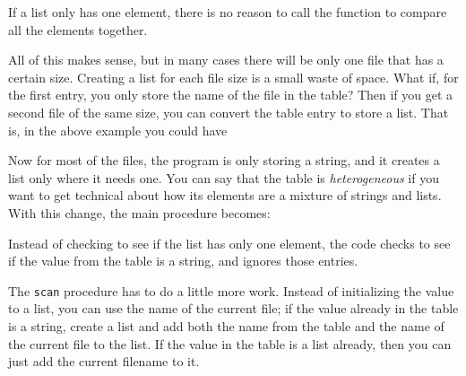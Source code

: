 
If a list only has one element, there is no reason to call the function
to compare all the elements together. 

All of this makes sense, but in many cases there will be only one file
that has a certain size. Creating a list for each file size is a small
waste of space. What if, for the first entry, you only store the name
of the file in the table? Then if you get a second file of the same
size, you can convert the table entry to store a list. That is, in the
above example you could have 


Now for most of the files, the program is only storing a string, and it
creates a list only where it needs one. You can say that the table is
\textit{heterogeneous} if you want to get technical about how its
elements are a mixture of strings and lists. With this change, the main
procedure becomes:


Instead of checking to see if the list has only one element, the code
checks to see if the value from the table is a string, and ignores
those entries.

The \texttt{scan} procedure has to do a little more work. Instead of initializing
the value to a list, you can use the name of the current file; if the
value already in the table is a string, create a list and add both the
name from the table and the name of the current file to the list. If
the value in the table is a list already, then you can just add the
current filename to it.

